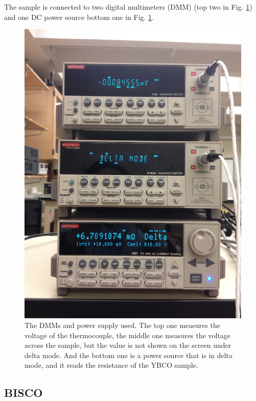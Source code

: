 \documentclass[prb,preprint]{revtex4-1}
\begin{document}
The sample is connected to two digital multimeters (DMM) (top two in Fig. \ref{meters}) and one DC power source {bottom one in Fig. \ref{meters}}. 

\begin{figure}[h]
\centering
\includegraphics[width=12cm]{ybcometers.jpg}
\caption{The DMMs and power supply used. The top one measures the voltage of the thermocouple, the middle one measures the voltage across the sample, but the value is not shown on the screen under delta mode. And the bottom one is a power source that is in delta mode, and it reads the resistance of the YBCO sample.}
\label{meters}
\end{figure}





\subsection{BISCO}
\end{document}

